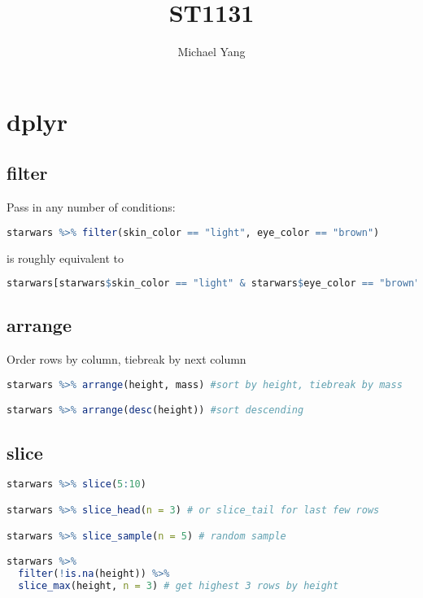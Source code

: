 \documentclass[11pt]{article}
\begin{document}
\title{ST1131}
\author{Michael Yang}
\date{}
\maketitle

\newpage


\section{dplyr}

\subsection{filter}

Pass in any number of conditions:

\begin{lstlisting}[language=R]
starwars %>% filter(skin_color == "light", eye_color == "brown")
\end{lstlisting}

is roughly equivalent to 

\begin{lstlisting}[language=R]
starwars[starwars$skin_color == "light" & starwars$eye_color == "brown", ]
\end{lstlisting}

\subsection{arrange}

Order rows by column, tiebreak by next column
\begin{lstlisting}[language=R]
starwars %>% arrange(height, mass) #sort by height, tiebreak by mass

starwars %>% arrange(desc(height)) #sort descending
\end{lstlisting}

\subsection{slice}

\begin{lstlisting}[language=R]
starwars %>% slice(5:10)

starwars %>% slice_head(n = 3) # or slice_tail for last few rows

starwars %>% slice_sample(n = 5) # random sample 

starwars %>%
  filter(!is.na(height)) %>%
  slice_max(height, n = 3) # get highest 3 rows by height
\end{lstlisting}
\end{document}
